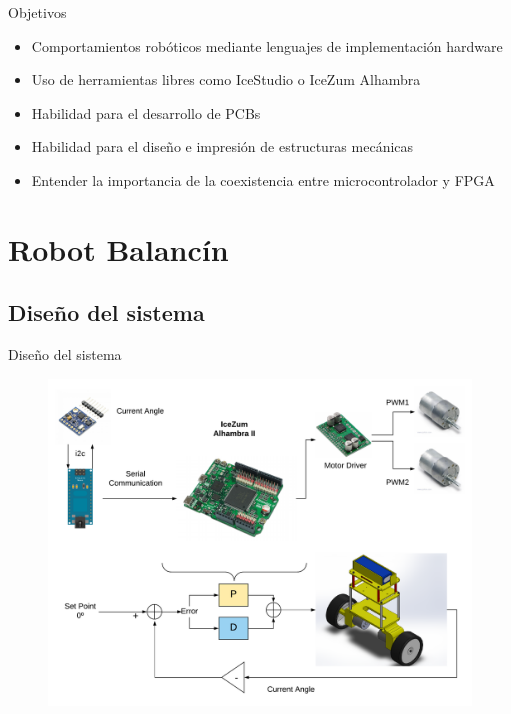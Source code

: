 \documentclass{beamer}
\begin{document}
\begin{frame}{Objetivos}
\begin{block}{}
	\begin{itemize}
		\item Comportamientos robóticos mediante lenguajes de implementación hardware \pause
		\item Uso de herramientas libres como IceStudio o IceZum Alhambra \pause
		\item Habilidad para el desarrollo de PCBs \pause
		\item Habilidad para el diseño e impresión de estructuras mecánicas \pause
		\item Entender la importancia de la coexistencia entre microcontrolador y FPGA 
	\end{itemize}
\end{block}
\end{frame}

\section{Robot Balancín}
\subsection{Diseño del sistema}
\begin{frame}{Diseño del sistema}
\begin{figure}[H]
	\center
	\includegraphics[trim = 0mm 0mm 0mm 0mm, clip,scale=0.3]{imagenes/Balancing_robot/final.pdf}
\end{figure}
\end{frame}	
\end{document}
